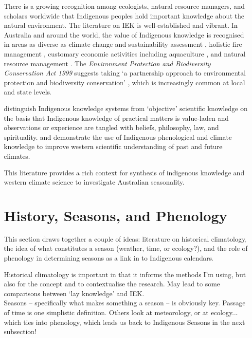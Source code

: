 There is a growing recognition among ecologists, natural resource managers, and 
scholars worldwide that Indigenous peoples hold important knowledge about the 
natural environment. The literature on IEK is well-established and vibrant.  In 
Australia and around the world, the value of Indigenous knowledge is recognised 
in areas as diverse as climate change and sustainability assessment
\citep[eg.][]{cochran2015}, holistic fire management \citep[eg.][]{clarke2009,price2012}, 
customary economic activities including aquaculture \citep{woodward2012a}, and 
natural resource management \citep[eg.][]{prober2011}.  The \textit{Environment 
Protection and Biodiversity Conservation Act 1999} suggests taking `a 
partnership approach to environmental protection and biodiversity conservation'
\citep{ens2012}, which is increasingly common at local and state levels.  

\citet{turner2009} distinguish Indigenous knowledge systems from `objective' 
scientific knowledge on the basis that Indigenous knowledge of practical 
matters is value-laden and observations or experience are tangled with beliefs, 
philosophy, law, and spirituality.  \citet{green2010a} and \citet{clarke2009} 
demonstrate the use of Indigenous phenological and climate knowledge to improve 
western scientific understanding of past and future climates.  

This literature provides a rich context for synthesis of indigenous knowledge 
and western climate science to investigate Australian seasonality.


\section{History, Seasons, and Phenology}
This section draws together a couple of ideas:  literature on historical 
climatology, the idea of what constitutes a season (weather, time, or ecology?),
and the role of phenology in determining seasons as a link in to Indigenous 
calendars.

Historical climatology is important in that it informs the methods I'm 
using, but also for the concept and to contextualise the research.  May lead to 
some comparisons between `lay knowledge' and IEK.\\

Seasons – specifically what makes something a season – is obviously key.  
Passage of time is one simplistic definition.  Others look at meteorology, or 
at ecology... which ties into phenology, which leads us back to Indigenous
Seasons in the next subsection!



